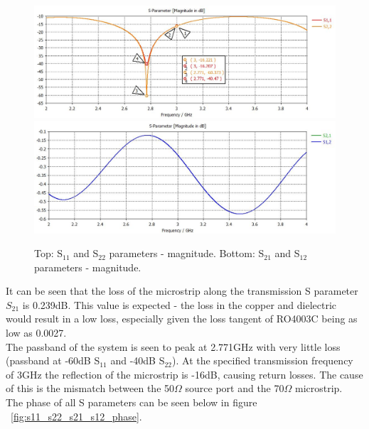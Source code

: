 \documentclass{paper}
\begin{document}
\begin{figure}[H]
	\centering
	\includegraphics[scale=0.4]{IMG/S11_and_S22}
	\includegraphics[scale=0.4]{IMG/S21_and_S12}
	\caption{Top: S$_{11}$ and S$_{22}$ parameters - magnitude. Bottom: S$_{21}$ and S$_{12}$ parameters - magnitude.}
	\label{fig:s11_s22_s21_s12}
\end{figure}

It can be seen that the loss of the microstrip along the transmission S parameter $S_{21}$ is 0.239dB. This value is expected - the loss in the copper and dielectric would result in a low loss, especially given the loss tangent of RO4003C being as low as 0.0027.\\

The passband of the system is seen to peak at 2.771GHz with very little loss (passband at -60dB S$_{11}$ and -40dB S$_{22}$). At the specified transmission frequency of 3GHz the reflection of the microstrip is -16dB, causing return losses. The cause of this is the mismatch between the 50$\Omega$ source port and the 70$\Omega$ microstrip.\\

The phase of all S parameters can be seen below in figure ~\ref{fig:s11_s22_s21_s12_phase}.\\
\end{document}
